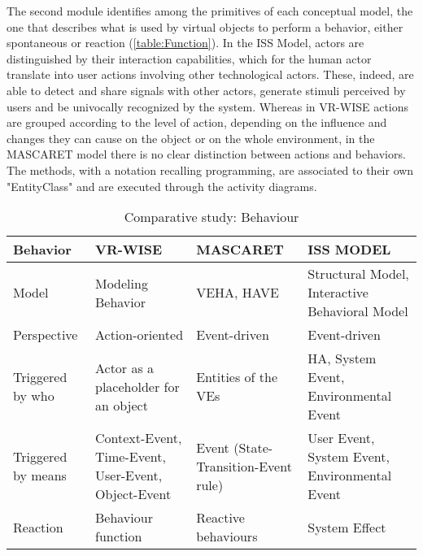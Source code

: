 The second module identifies among the primitives of each conceptual model, the one that describes what is used by virtual objects to perform a behavior, either spontaneous or reaction (\autoref{table:Function}). In the ISS Model, actors are distinguished by their interaction capabilities, which for the human actor translate into user actions involving other technological actors. These, indeed, are able to detect and share signals with other actors, generate stimuli perceived by users and be univocally recognized by the system. Whereas in VR-WISE actions are grouped according to the level of action, depending on the influence and changes they can cause on the object or on the whole environment, in the MASCARET model there is no clear distinction between actions and behaviors. The methods, with a notation recalling programming, are associated to their own "EntityClass" and are executed through the activity diagrams. 

\begin{table}
\begin{tabular}{|p{2.2cm}|p{3.1cm}|p{3.1cm}|p{3.1cm}|} 
\hline %
\textbf{Behavior} 
& \textbf{VR-WISE} 
& \textbf{MASCARET}
& \textbf{ISS MODEL} \\ 
\hline
Model
& Modeling Behavior 
& VEHA, HAVE
& Structural Model, Interactive Behavioral Model \\ 
\hline
Perspective
& Action-oriented
& Event-driven
& Event-driven \\ 
\hline
Triggered by who
& Actor as a placeholder for an object
& Entities of the VEs
& HA, System Event, Environmental Event \\
\hline
Triggered by means
& Context-Event, Time-Event, User-Event, Object-Event
& Event (State-Transition-Event rule)
& User Event, System Event, Environmental Event \\
\hline
Reaction
& Behaviour function
& Reactive behaviours
& System Effect \\
\hline
\end{tabular} 
\caption{Comparative study: Behaviour}
\label{table:Behaviour}
\end{table}


